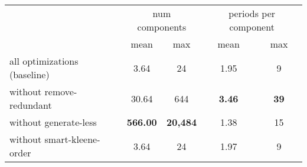\begin{table}[H]
	\centering
	\begin{tabular}{l c c c c}
		\toprule
		& \multicolumn{2}{c}{num components} & \multicolumn{2}{c}{periods per component} \\
		\cmidrule(lr){2-3} \cmidrule(lr){4-5}
		& mean & max & mean & max \\
		\midrule
	all optimizations (baseline) & 3.64 & 24 & 1.95 & 9 \\
	without remove-redundant & 30.64 & 644 & \textbf{3.46} & \textbf{39} \\
	without generate-less & \textbf{566.00} & \textbf{20{,}484} & 1.38 & 15 \\
	without smart-kleene-order & 3.64 & 24 & 1.97 & 9 \\
  \bottomrule
	\end{tabular}
\end{table}
